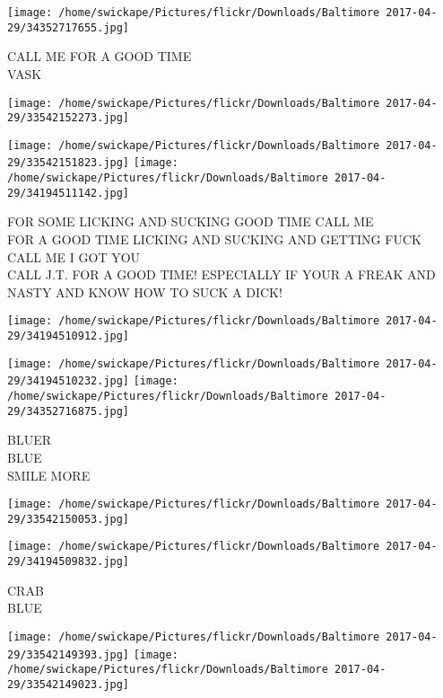 \documentclass[10pt,letterpaper]{article}
\begin{document}
\vspace{0.25in}
\texttt{[image: /home/swickape/Pictures/flickr/Downloads/Baltimore 2017-04-29/34352717655.jpg]}

CALL ME FOR A GOOD TIME\\
VASK\\
\pagebreak

\texttt{[image: /home/swickape/Pictures/flickr/Downloads/Baltimore 2017-04-29/33542152273.jpg]}

\vspace{0.25in}
\texttt{[image: /home/swickape/Pictures/flickr/Downloads/Baltimore 2017-04-29/33542151823.jpg]}
\texttt{[image: /home/swickape/Pictures/flickr/Downloads/Baltimore 2017-04-29/34194511142.jpg]}

FOR SOME LICKING AND SUCKING GOOD TIME CALL ME\\
FOR A GOOD TIME LICKING AND SUCKING AND GETTING FUCK CALL ME I GOT YOU\\
CALL J.T. FOR A GOOD TIME!   ESPECIALLY IF YOUR A FREAK AND NASTY AND KNOW HOW TO SUCK A DICK!\\
\pagebreak

\texttt{[image: /home/swickape/Pictures/flickr/Downloads/Baltimore 2017-04-29/34194510912.jpg]}

\vspace{0.25in}
\texttt{[image: /home/swickape/Pictures/flickr/Downloads/Baltimore 2017-04-29/34194510232.jpg]}
\texttt{[image: /home/swickape/Pictures/flickr/Downloads/Baltimore 2017-04-29/34352716875.jpg]}

BLUER\\
BLUE\\
SMILE MORE\\
\pagebreak

\texttt{[image: /home/swickape/Pictures/flickr/Downloads/Baltimore 2017-04-29/33542150053.jpg]}

\vspace{0.25in}
\texttt{[image: /home/swickape/Pictures/flickr/Downloads/Baltimore 2017-04-29/34194509832.jpg]}

CRAB\\
BLUE\\
\pagebreak

\texttt{[image: /home/swickape/Pictures/flickr/Downloads/Baltimore 2017-04-29/33542149393.jpg]}
\texttt{[image: /home/swickape/Pictures/flickr/Downloads/Baltimore 2017-04-29/33542149023.jpg]}
\end{document}
